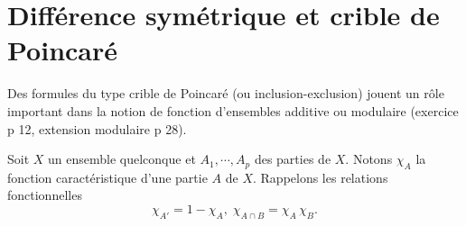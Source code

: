 \section{Différence symétrique et crible de Poincaré}\label{criblePoinc}
Des formules du type crible de Poincaré (ou inclusion-exclusion) jouent un rôle important dans la notion de fonction d'ensembles additive ou modulaire (exercice p 12, extension modulaire p 28).

\noindent Soit $X$ un ensemble quelconque et $A_1, \cdots, A_p$ des parties de $X$. Notons $\chi_A$ la fonction caractéristique d'une partie $A$ de $X$. Rappelons les relations fonctionnelles
\begin{displaymath}
  \chi_{A'} = 1 - \chi_A, \; \chi_{A \cap B} = \chi_A \, \chi_B.
\end{displaymath}

